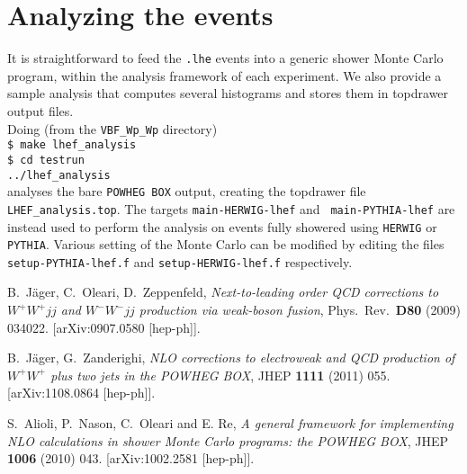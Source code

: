 \documentclass[a4paper,11pt]{article}
\begin{document}
\section*{Analyzing the events}
%
It is straightforward to feed the {\tt *.lhe} events into a generic
shower Monte Carlo program, within the analysis framework of each
experiment. We also provide a sample analysis that computes several
histograms and stores them in topdrawer output files.
\\[2ex]
Doing (from the {\tt VBF\_Wp\_Wp} directory)
\\[2ex]
{\tt \$ make lhef\_analysis}
\\[2ex]
{\tt \$ cd testrun}
\\[2ex]
{\tt ../lhef\_analysis}
\\[2ex]
analyses the bare {\tt POWHEG BOX} output, creating the topdrawer file
{\tt LHEF\_analysis.top}. The targets {\tt main-HERWIG-lhef} and {\tt
  main-PYTHIA-lhef} are instead used to perform the analysis on events
fully showered using {\tt HERWIG} or {\tt PYTHIA}. Various setting of
the Monte Carlo can be modified by editing the files {\tt
  setup-PYTHIA-lhef.f} and {\tt setup-HERWIG-lhef.f} respectively.
%
%
\begin{thebibliography}{99}
 B.~J\"ager, C.~Oleari, D.~Zeppenfeld, {\em
    Next-to-leading order QCD corrections to $W^+W^+jj$ and $W^-W^-jj$
    production via weak-boson fusion}, Phys.~Rev.~{\bf D80} (2009)
  034022.  [arXiv:0907.0580 [hep-ph]].

 B.~J\"ager, G.~Zanderighi, {\em NLO corrections to
    electroweak and QCD production of $W^+W^+$ plus two jets in the
    POWHEG BOX}, JHEP {\bf 1111} (2011) 055.
  [arXiv:1108.0864 [hep-ph]].
  
 S.~Alioli, P.~Nason, C.~Oleari and E. Re, {\em
    A general framework for implementing NLO calculations in shower
    Monte Carlo programs: the POWHEG BOX}, JHEP {\bf 1006} (2010)
  043.  [arXiv:1002.2581 [hep-ph]].

\end{thebibliography}
\end{document}
